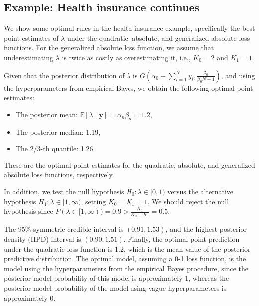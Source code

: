 \subsection{Example: Health insurance continues}\label{131}

We show some optimal rules in the health insurance example, specifically the best point estimates of $\lambda$ under the quadratic, absolute, and generalized absolute loss functions. For the generalized absolute loss function, we assume that underestimating $\lambda$ is twice as costly as overestimating it, i.e., $K_0 = 2$ and $K_1 = 1$.

Given that the posterior distribution of $\lambda$ is $G(\alpha_0 + \sum_{i=1}^N y_i, \frac{\beta_0}{\beta_0 N + 1})$, and using the hyperparameters from empirical Bayes, we obtain the following optimal point estimates:
\begin{itemize}
	\item The posterior mean: $\mathbb{E}[\lambda \mid \mathbf{y}] = \alpha_n \beta_n = 1.2$,
	\item The posterior median: 1.19,
	\item The 2/3-th quantile: 1.26.
\end{itemize}
These are the optimal point estimates for the quadratic, absolute, and generalized absolute loss functions, respectively.

In addition, we test the null hypothesis $H_0: \lambda \in [0, 1)$ versus the alternative hypothesis $H_1: \lambda \in [1, \infty)$, setting $K_0 = K_1 = 1$. We should reject the null hypothesis since $P(\lambda \in [1, \infty)) = 0.9 > \frac{K_1}{K_0 + K_1} = 0.5$.

The 95\% symmetric credible interval is $(0.91, 1.53)$, and the highest posterior density (HPD) interval is $(0.90, 1.51)$. Finally, the optimal point prediction under the quadratic loss function is 1.2, which is the mean value of the posterior predictive distribution. The optimal model, assuming a 0-1 loss function, is the model using the hyperparameters from the empirical Bayes procedure, since the posterior model probability of this model is approximately 1, whereas the posterior model probability of the model using vague hyperparameters is approximately 0.

